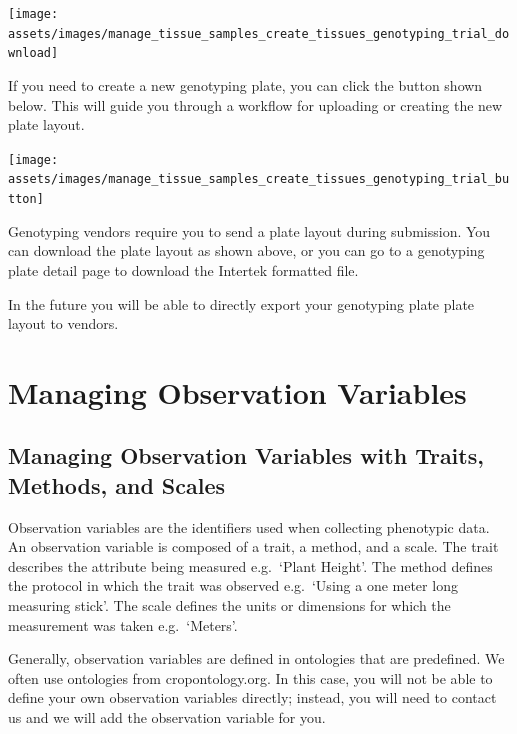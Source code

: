 \documentclass[
  12pt,
]{book}
\begin{document}
\begin{center}\texttt{[image: assets/images/manage\_tissue\_samples\_create\_tissues\_genotyping\_trial\_download]} \end{center}

If you need to create a new genotyping plate, you can click the button shown below. This will guide you through a workflow for uploading or creating the new plate layout.

\begin{center}\texttt{[image: assets/images/manage\_tissue\_samples\_create\_tissues\_genotyping\_trial\_button]} \end{center}

Genotyping vendors require you to send a plate layout during submission. You can download the plate layout as shown above, or you can go to a genotyping plate detail page to download the Intertek formatted file.

In the future you will be able to directly export your genotyping plate plate layout to vendors.

\hypertarget{managing-observation-variables}{%
\chapter{Managing Observation Variables}\label{managing-observation-variables}}

\hypertarget{managing-observation-variables-with-traits-methods-and-scales}{%
\section{Managing Observation Variables with Traits, Methods, and Scales}\label{managing-observation-variables-with-traits-methods-and-scales}}

Observation variables are the identifiers used when collecting phenotypic data. An observation variable is composed of a trait, a method, and a scale. The trait describes the attribute being measured e.g.~`Plant Height'. The method defines the protocol in which the trait was observed e.g.~`Using a one meter long measuring stick'. The scale defines the units or dimensions for which the measurement was taken e.g.~`Meters'.

Generally, observation variables are defined in ontologies that are predefined. We often use ontologies from cropontology.org. In this case, you will not be able to define your own observation variables directly; instead, you will need to contact us and we will add the observation variable for you.
\end{document}
